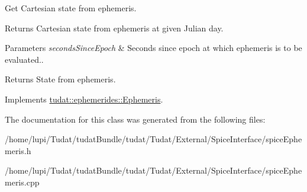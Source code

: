 Get Cartesian state from ephemeris. 

Returns Cartesian state from ephemeris at given Julian day. 
\begin{DoxyParams}{Parameters}
{\em seconds\+Since\+Epoch} & Seconds since epoch at which ephemeris is to be evaluated.. \\
\hline
\end{DoxyParams}
\begin{DoxyReturn}{Returns}
State from ephemeris. 
\end{DoxyReturn}


Implements \hyperlink{classtudat_1_1ephemerides_1_1Ephemeris_a9ffa2e6b00aa190385d87266bc6ca091}{tudat\+::ephemerides\+::\+Ephemeris}.



The documentation for this class was generated from the following files\+:\begin{DoxyCompactItemize}
\item 
/home/lupi/\+Tudat/tudat\+Bundle/tudat/\+Tudat/\+External/\+Spice\+Interface/spice\+Ephemeris.\+h\item 
/home/lupi/\+Tudat/tudat\+Bundle/tudat/\+Tudat/\+External/\+Spice\+Interface/spice\+Ephemeris.\+cpp\end{DoxyCompactItemize}
